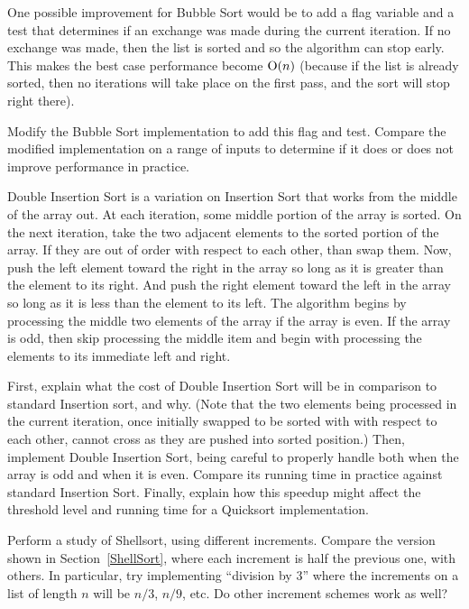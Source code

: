 \begin{projects}

\item
One possible improvement for Bubble Sort would be to add a flag
variable and a test that determines if an exchange was made during the
current iteration.
If no exchange was made, then the list is sorted and so the algorithm
can stop early.
This makes the best case performance become $\mbox{${\rm O}(n)$}$ (because if the list
is already sorted, then no iterations will take place on the first
pass, and the sort will stop right there).

Modify the Bubble Sort implementation to add this flag and test.
Compare the modified implementation on a range of inputs to determine
if it does or does not improve performance in practice.

\item
Double Insertion Sort
is a variation on Insertion Sort that works from the middle of the
array out.
At each iteration, some middle portion of the array is sorted.
On the next iteration, take the two adjacent elements to the sorted
portion of the array.
If they are out of order with respect to each other, than swap them.
Now, push the left element toward the right in the array so long as it
is greater than the element to its right.
And push the right element toward the left in the array so long as it
is less than the element to its left.
The algorithm begins by processing the middle two elements of the
array if the array is even.
If the array is odd, then skip processing the middle item and
begin with processing the elements to its immediate left and right.

First, explain what the cost of Double Insertion Sort will be in
comparison to standard Insertion sort, and why.
(Note that the two elements being processed in the current iteration,
once initially swapped to be sorted with with respect to each other,
cannot cross as they are pushed into sorted position.)
Then, implement Double Insertion Sort, being careful to properly
handle both when the array is odd and when it is even.
Compare its running time in practice against standard Insertion Sort.
Finally, explain how this speedup might affect the threshold level and
running time for a Quicksort implementation.

\item
Perform a study of Shellsort, using different increments.
Compare the version shown in Section~\ref{ShellSort}, where each
increment is half the previous one, with others.
In particular, try implementing ``division by 3'' where the increments
on a list of length \(n\) will be \(n/3\), \(n/9\), etc.
Do other increment schemes work as well?


\end{projects}
